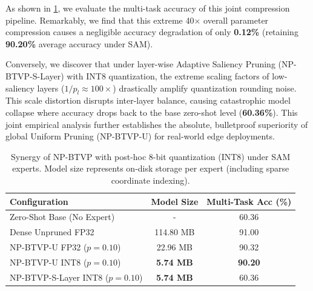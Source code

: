 As shown in \cref{tab:quantization_synergy}, we evaluate the multi-task accuracy of this joint compression pipeline. Remarkably, we find that this extreme 40$\times$ overall parameter compression causes a negligible accuracy degradation of only \textbf{0.12\%} (retaining \textbf{90.20\%} average accuracy under SAM). 

Conversely, we discover that under layer-wise Adaptive Saliency Pruning (NP-BTVP-S-Layer) with INT8 quantization, the extreme scaling factors of low-saliency layers ($1/p_l \approx 100\times$) drastically amplify quantization rounding noise. This scale distortion disrupts inter-layer balance, causing catastrophic model collapse where accuracy drops back to the base zero-shot level (\textbf{60.36\%}). This joint empirical analysis further establishes the absolute, bulletproof superiority of global Uniform Pruning (NP-BTVP-U) for real-world edge deployments.

\begin{table}[tb]
\caption{Synergy of NP-BTVP with post-hoc 8-bit quantization (INT8) under SAM experts. Model size represents on-disk storage per expert (including sparse coordinate indexing).}
\label{tab:quantization_synergy}
\vskip 0.15in
\centering
\small
\begin{tabular}{lcc}
\toprule
\textbf{Configuration} & \textbf{Model Size} & \textbf{Multi-Task Acc (\%)} \\
\midrule
Zero-Shot Base (No Expert) & - & 60.36 \\
Dense Unpruned FP32 & 114.80 MB & 91.00 \\
NP-BTVP-U FP32 ($p=0.10$) & 22.96 MB & 90.32 \\
NP-BTVP-U INT8 ($p=0.10$) & \textbf{5.74 MB} & \textbf{90.20} \\
NP-BTVP-S-Layer INT8 ($p=0.10$) & \textbf{5.74 MB} & 60.36 \\
\bottomrule
\end{tabular}
\end{table}